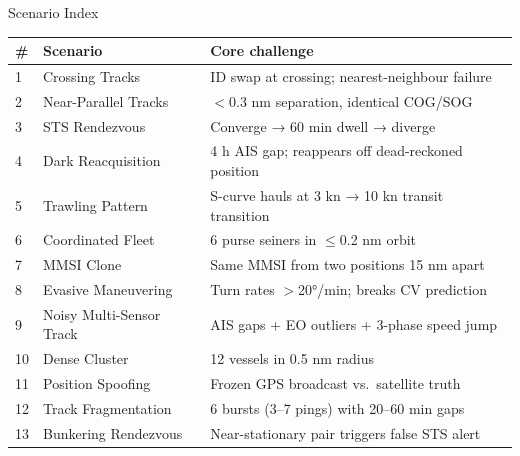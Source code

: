 \documentclass[aspectratio=169,11pt]{beamer}
\begin{document}
\begin{frame}{Scenario Index}

  \small
  \begin{tabularx}{\textwidth}{@{}llX@{}}
    \toprule
    \textbf{\#} & \textbf{Scenario} & \textbf{Core challenge} \\
    \midrule
    1  & Crossing Tracks           & ID swap at crossing; nearest-neighbour failure \\
    2  & Near-Parallel Tracks      & $<$0.3 nm separation, identical COG/SOG \\
    3  & STS Rendezvous            & Converge → 60 min dwell → diverge \\
    4  & Dark Reacquisition        & 4 h AIS gap; reappears off dead-reckoned position \\
    5  & Trawling Pattern          & S-curve hauls at 3 kn → 10 kn transit transition \\
    6  & Coordinated Fleet         & 6 purse seiners in $\leq$0.2 nm orbit \\
    7  & MMSI Clone                & Same MMSI from two positions 15 nm apart \\
    8  & Evasive Maneuvering       & Turn rates $>$20°/min; breaks CV prediction \\
    9  & Noisy Multi-Sensor Track  & AIS gaps + EO outliers + 3-phase speed jump \\
    10 & Dense Cluster             & 12 vessels in 0.5 nm radius \\
    11 & Position Spoofing         & Frozen GPS broadcast vs.\ satellite truth \\
    12 & Track Fragmentation       & 6 bursts (3–7 pings) with 20–60 min gaps \\
    13 & Bunkering Rendezvous      & Near-stationary pair triggers false STS alert \\
    \bottomrule
  \end{tabularx}
\end{frame}
\end{document}
